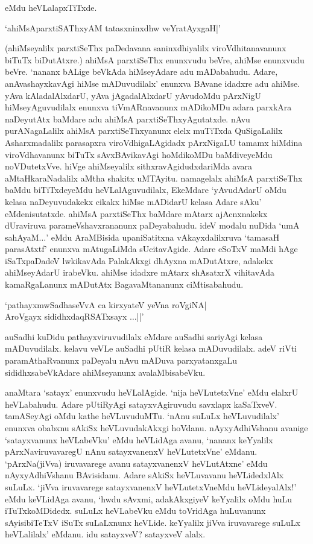 eMdu heVLalapxTiTxde.

\begin{shloka}
`ahiMsAparxtiSAThxyAM tatasxninxdhw veYratAyxgaH|'
\end{shloka}

(ahiMseyalilx parxtiSeThx paDedavana saninxdhiyalilx viroVdhitanavanunx biTuTx biDutAtxre.) ahiMsA parxtiSeThx enunxvudu beVre, ahiMse enunxvudu beVre. `nananx bALige beVkAda hiMseyAdare adu mADabahudu. Adare, anAvashayxkavAgi hiMse mADuvudilalx' enunxva BAvane idadxre adu ahiMse. yAva kAladalAlxdarU, yAva jAgadalAlxdarU yAvudoMdu pArxNigU hiMseyAguvudilalx enunxva tiVmARnavanunx mADikoMDu adara parxkAra naDeyutAtx baMdare adu ahiMsA parxtiSeThxyAgutatxde. nAvu purANagaLalilx ahiMsA parxtiSeThxyanunx elelx muTiTxda QuSigaLalilx Asharxmadalilx parasapxra viroVdhigaLAgidadx pArxNigaLU tamamx hiMdina viroVdhavanunx biTuTx sAvxBAvikavAgi hoMdikoMDu baMdiveyeMdu noVDutetxVve. hiVge ahiMseyalilx sithxravAgidudxdariMda avara aMtaHkaraNadalilx aMtha shakitx uMTAyitu. namagelalx ahiMsA parxtiSeThx baMdu biTiTxdeyeMdu heVLalAguvudilalx, EkeMdare `yAvudAdarU oMdu kelasa naDeyuvudakekx cikakx hiMse mADidarU kelasa Adare sAku' eMdenisutatxde. ahiMsA parxtiSeThx baMdare mAtarx ajAcnxnakekx dUraviruva parameVshavxrananunx paDeyabahudu. ideV modalu nuDida `umA sahAyaM$\ldots$' eMdu AraMBisida upaniSatitxna vAkayxdalilxruva `tamasaH parasAtxtf' enunxva mAtugaLiMda sUcitavAgide. Adare eSoTxV maMdi hAge iSaTxpaDadeV lwkikavAda PalakAkxgi dhAyxna mADutAtxre, adakekx ahiMseyAdarU irabeVku. ahiMse idadxre mAtarx shAsatxrX vihitavAda kamaRgaLanunx mADutAtx BagavaMtananunx ciMtisabahudu.

\begin{shloka}
`pathayxmwSadhaseVvA ca kirxyateV yeVna roVgiNA|\\
AroVgayx sididhxdaqRSATxsayx $\ldots$||'
\end{shloka}

auSadhi kuDidu pathayxviruvudilalx eMdare auSadhi sariyAgi kelasa mADuvudilalx. kelavu veVLe auSadhi pUtiR kelasa mADuvudilalx. adeV riVti paramAthaRvanunx paDeyalu nAvu mADuva parxyatanxgaLu sididhxsabeVkAdare ahiMseyanunx avalaMbisabeVku.

anaMtara `satayx' enunxvudu heVLalAgide. `nija heVLutetxVne' eMdu elalxrU heVLabahudu. Adare pUtiRyAgi satayxvAgiruvudu savxlapx kaSaTxveV. tamASeyAgi oMdu kathe heVLuvuduMTu. `nAnu suLuLx heVLuvudilalx' enunxva obabxnu sAkiSx heVLuvudakAkxgi hoVdanu. nAyxyAdhiVshanu avanige `satayxvanunx heVLabeVku' eMdu heVLidAga avanu, `nananx keYyalilx pArxNaviruvavaregU nAnu satayxvanenxV heVLutetxVne' eMdanu. `pArxNa(jiVva) iruvavarege avanu satayxvanenxV heVLutAtxne' eMdu nAyxyAdhiVshanu BAvisidanu. Adare sAkiSx heVLuvavanu heVLidedxlAlx suLuLx. `jiVva iruvavarege satayxvanenxV heVLutetxVneMdu heVLideyalAlx!' eMdu keVLidAga avanu, `hwdu sAvxmi, adakAkxgiyeV keYyalilx oMdu huLu iTuTxkoMDidedx. suLuLx heVLabeVku eMdu toVridAga huLuvanunx sAyisibiTeTxV iSuTx suLaLxnunx heVLide. keYyalilx jiVva iruvavarege suLuLx heVLalilalx' eMdanu. idu satayxveV? satayxveV alalx.

